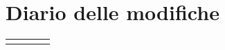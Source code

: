 \newpage
\section*{Diario delle modifiche}

\begin{tabular}{|l|c|c|c|}
\centering

\end{tabular}

\newpage
